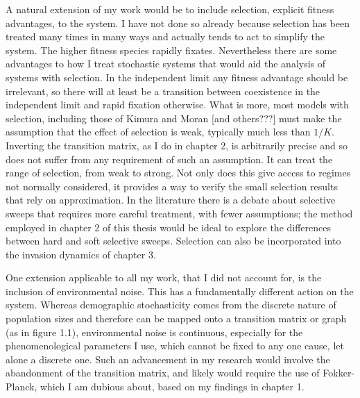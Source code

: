 A natural extension of my work would be to include selection, explicit fitness advantages, to the system. 
I have not done so already because selection has been treated many times in many ways \cite{a bunch???} and actually tends to act to simplify the system. 
The higher fitness species rapidly fixates. 
Nevertheless there are some advantages to how I treat stochastic systems that would aid the analysis of systems with selection. 
In the independent limit any fitness advantage should be irrelevant, so there will at least be a transition between coexistence in the independent limit and rapid fixation otherwise. 
What is more, most models with selection, including those of Kimura \cite{Kimura??} and Moran \cite{Moran with selection??} [and others???] must make the assumption that the effect of selection is weak, typically much less than $1/K$. 
Inverting the transition matrix, as I do in chapter 2, is arbitrarily precise and so does not suffer from any requirement of such an assumption. It can treat the range of selection, from weak to strong. 
Not only does this give access to regimes not normally considered, it provides a way to verify the small selection results that rely on approximation. 
In the literature there is a debate about selective sweeps \cite{Jensen2014} that requires more careful treatment, with fewer assumptions; the method employed in chapter 2 of this thesis would be ideal to explore the differences between hard and soft selective sweeps. 
Selection can also be incorporated into the invasion dynamics of chapter 3. 

One extension applicable to all my work, that I did not account for, is the inclusion of environmental noise. 
This has a fundamentally different action on the system. 
Whereas demographic stochasticity comes from the discrete nature of population sizes and therefore can be mapped onto a transition matrix or graph (as in figure 1.1),%
environmental noise is continuous, especially for the phenomenological parameters I use, which cannot be fixed to any one cause, let alone a discrete one. 
Such an advancement in my research would involve the abandonment of the transition matrix, and likely would require the use of Fokker-Planck, which I am dubious about, based on my findings in chapter 1. 

